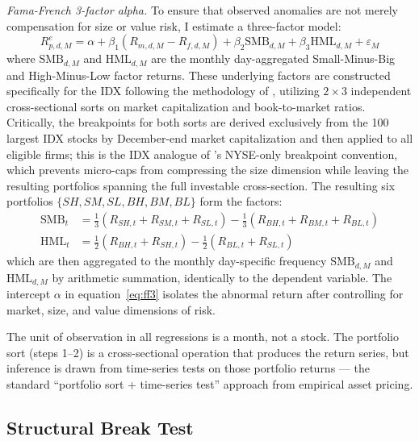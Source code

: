 \documentclass[
	a4paper,
	10pt,
	twoside,
]{LTJournalArticle}
\begin{document}
\textit{Fama-French 3-factor alpha.} To ensure that observed anomalies are not merely compensation for size or value risk, I estimate a three-factor model:
\begin{equation}
	R^{e}_{p, d, M} = \alpha + \beta_1 (R_{m, d, M} - R_{f, d, M}) + \beta_2 \text{SMB}_{d, M} + \beta_3 \text{HML}_{d, M} + \varepsilon_M
	\label{eq:ff3}
\end{equation}
where $\text{SMB}_{d, M}$ and $\text{HML}_{d, M}$ are the monthly day-aggregated Small-Minus-Big and High-Minus-Low factor returns. These underlying factors are constructed specifically for the IDX following the methodology of \citet{foye2020}, utilizing $2 \times 3$ independent cross-sectional sorts on market capitalization and book-to-market ratios. Critically, the breakpoints for both sorts are derived exclusively from the 100 largest IDX stocks by December-end market capitalization and then applied to all eligible firms; this is the IDX analogue of \citet{fama1993}'s NYSE-only breakpoint convention, which prevents micro-caps from compressing the size dimension while leaving the resulting portfolios spanning the full investable cross-section. The resulting six portfolios $\{SH, SM, SL, BH, BM, BL\}$ form the factors:
\begin{align*}
    \text{SMB}_t &= \tfrac{1}{3}(R_{SH,t} + R_{SM,t} + R_{SL,t}) - \tfrac{1}{3}(R_{BH,t} + R_{BM,t} + R_{BL,t}) \\
    \text{HML}_t &= \tfrac{1}{2}(R_{BH,t} + R_{SH,t}) - \tfrac{1}{2}(R_{BL,t} + R_{SL,t})
\end{align*}
which are then aggregated to the monthly day-specific frequency $\text{SMB}_{d, M}$ and $\text{HML}_{d, M}$ by arithmetic summation, identically to the dependent variable. The intercept $\alpha$ in equation~\ref{eq:ff3} isolates the abnormal return after controlling for market, size, and value dimensions of risk.

The unit of observation in all regressions is a month, not a stock. The portfolio sort (steps 1--2) is a cross-sectional operation that produces the return series, but inference is drawn from time-series tests on those portfolio returns --- the standard ``portfolio sort + time-series test'' approach from empirical asset pricing.

\subsection{Structural Break Test}
\end{document}
